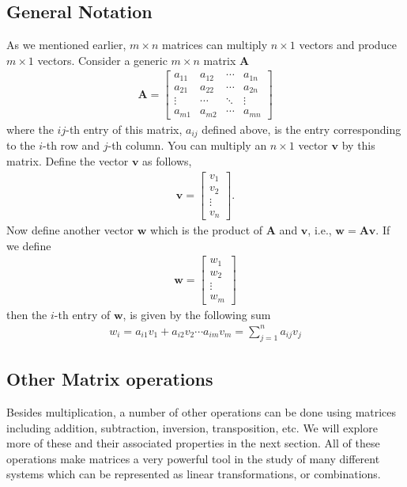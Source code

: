 \subsection{General Notation}
As we mentioned earlier, $m\times n$ matrices can multiply $n\times 1$ vectors and produce $m\times 1$ vectors. Consider  a generic $m \times n$ matrix $\mathbf{A}$
\begin{align*}
\mathbf{A} =
\begin{bmatrix}
    a_{11} & a_{12}& \cdots & a_{1n}\\
    a_{21} & a_{22} & \cdots & a_{2n}  \\
    \vdots & \cdots & \ddots & \vdots\\
    a_{m1} & a_{m2} & \cdots & a_{mn}
  \end{bmatrix}
\end{align*}
where the $ij$-th entry of this matrix, $a_{ij}$ defined above, is the entry corresponding to the $i$-th row and $j$-th column.
You can multiply an  $n\times 1$ vector $\mathbf{v}$ by this matrix. Define the vector $\mathbf{v}$ as follows,
\begin{align*}
\mathbf{v } =
\begin{bmatrix}
    v_{1}\\
    v_{2}\\
    \vdots\\
    v_{n}
  \end{bmatrix}.
\end{align*}
Now define another vector $\mathbf{w}$ which is the product of $\mathbf{A}$ and $\mathbf{v}$, i.e., $\mathbf{w} = \mathbf{Av}$. If we define
\begin{align*}
\mathbf{w} =
\begin{bmatrix}
    w_{1}\\
    w_{2}\\
    \vdots\\
    w_{m}
  \end{bmatrix}
\end{align*}
then the $i$-th entry of $\mathbf{w}$, is given by the following sum
\begin{align*}
w_{i} = a_{i1}v_{1} + a_{i2}v_2 \cdots a_{im}v_m = \sum_{j = 1}^n a_{ij}v_{j}
\end{align*}

\subsection{Other Matrix operations}
Besides multiplication, a number of other operations can be done using matrices including addition, subtraction, inversion, transposition, etc. We will explore more of these and their associated properties in the next section.  All of these operations make matrices a very powerful tool in the study of many different systems which can be represented as linear transformations, or combinations.

